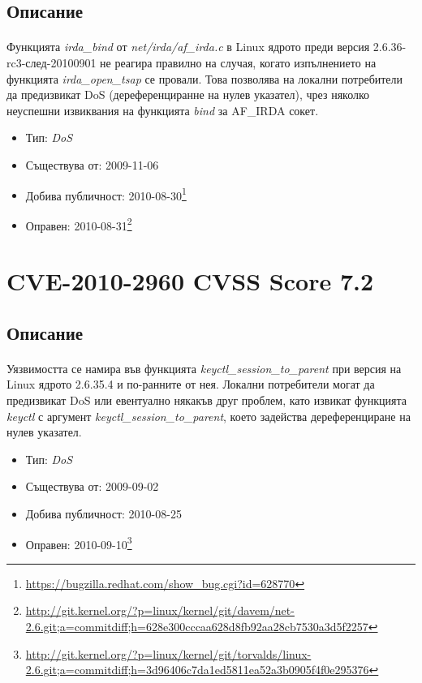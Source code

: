 \documentclass[a4paper,12pt,leqno]{article}
\begin{document}
\subsection{Описание}
\paragraph{}
Функцията \textit{irda\_bind} от \textit{net/irda/af\_irda.c} в Linux ядрото преди версия 2.6.36-rc3-след-20100901 не реагира правилно на случая, когато изпълнението на функцията \textit{irda\_open\_tsap} се провали. Това позволява на локални потребители да предизвикат DoS (дереференциранне на нулев указател), чрез няколко неуспешни извиквания на функцията \textit{bind} за AF\_IRDA сокет.

\begin{itemize}
    \item Тип: \textit{DoS}
    \item Съществува от: 2009-11-06
  	\item Добива публичност: 2010-08-30\footnote{\url{https://bugzilla.redhat.com/show_bug.cgi?id=628770}}
    \item Оправен: 2010-08-31\footnote{\url{http://git.kernel.org/?p=linux/kernel/git/davem/net-2.6.git;a=commitdiff;h=628e300cccaa628d8fb92aa28cb7530a3d5f2257}}
\end{itemize}

\section{CVE-2010-2960 CVSS Score 7.2}
\subsection{Описание}
\paragraph{}
Уязвимостта се намира във функцията \textit{keyctl\_session\_to\_parent} при версия на 
Linux ядрото 2.6.35.4 и по-ранните от нея. Локални потребители могат да 
предизвикат DoS или евентуално някакъв друг проблем, като извикат 
функцията \textit{keyctl} с аргумент \textit{keyctl\_session\_to\_parent}, което задейства 
дереференциране на нулев указател.

\begin{itemize}
    \item Тип: \textit{DoS}
    \item Съществува от: 2009-09-02
  	\item Добива публичност: 2010-08-25
    \item Оправен: 2010-09-10\footnote{\url{http://git.kernel.org/?p=linux/kernel/git/torvalds/linux-2.6.git;a=commitdiff;h=3d96406c7da1ed5811ea52a3b0905f4f0e295376}}
\end{itemize}
\end{document}
